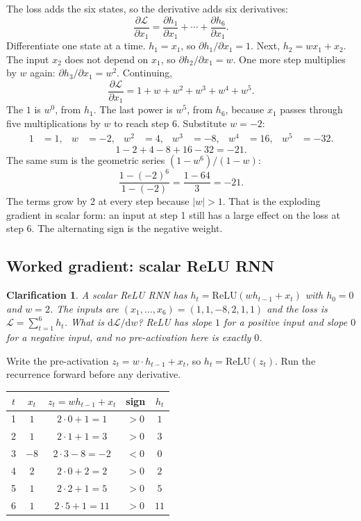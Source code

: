 \documentclass[11pt]{article}
\newtheorem*{clarification}{Clarification}
\begin{document}
The loss adds the six states, so the derivative adds six derivatives:
\[
\frac{\partial\mathcal{L}}{\partial x_1}
=
\frac{\partial h_1}{\partial x_1}
+\cdots+
\frac{\partial h_6}{\partial x_1}.
\]
Differentiate one state at a time. \(h_1=x_1\), so
\(\partial h_1/\partial x_1=1\). Next,
\(h_2=wx_1+x_2\). The input \(x_2\) does not depend on \(x_1\), so
\(\partial h_2/\partial x_1=w\). One more step multiplies by \(w\) again:
\(\partial h_3/\partial x_1=w^2\). Continuing,
\[
\frac{\partial\mathcal{L}}{\partial x_1}
=
1+w+w^2+w^3+w^4+w^5.
\]
The \(1\) is \(w^0\), from \(h_1\). The last power is \(w^5\), from \(h_6\),
because \(x_1\) passes through five multiplications by \(w\) to reach step
6. Substitute \(w=-2\):
\begin{align*}
1&=1, &
w&=-2, &
w^2&=4, &
w^3&=-8, &
w^4&=16, &
w^5&=-32.
\end{align*}
\[
1-2+4-8+16-32=-21.
\]
The same sum is the geometric series \((1-w^6)/(1-w)\):
\[
\frac{1-(-2)^6}{1-(-2)}
=
\frac{1-64}{3}
=
-21.
\]
The terms grow by 2 at every step because \(|w|>1\). That is the exploding
gradient in scalar form: an input at step 1 still has a large effect on the
loss at step 6. The alternating sign is the negative weight.

\subsection{Worked gradient: scalar ReLU RNN}
\label{sec:q4}

\begin{clarification}
A scalar ReLU RNN has \(h_t=\mathrm{ReLU}(w h_{t-1}+x_t)\) with \(h_0=0\)
and \(w=2\). The inputs are \((x_1,\ldots,x_6)=(1,1,-8,2,1,1)\) and the loss
is \(\mathcal{L}=\sum_{t=1}^{6}h_t\). What is \(\mathrm{d}\mathcal{L}/\mathrm{d}w\)?
ReLU has slope \(1\) for a positive input and slope \(0\) for a negative
input, and no pre-activation here is exactly \(0\).
\end{clarification}

Write the pre-activation \(z_t=w\cdot h_{t-1}+x_t\), so
\(h_t=\mathrm{ReLU}(z_t)\). Run the recurrence forward before any
derivative.

\begin{center}
\begin{tabular}{@{}ccccc@{}}
\toprule
\(t\) & \(x_t\) & \(z_t=w h_{t-1}+x_t\) & sign & \(h_t\) \\
\midrule
1 & \(1\)  & \(2\cdot 0+1=1\)   & \(>0\) & \(1\) \\
2 & \(1\)  & \(2\cdot 1+1=3\)   & \(>0\) & \(3\) \\
3 & \(-8\) & \(2\cdot 3-8=-2\) & \(<0\) & \(0\) \\
4 & \(2\)  & \(2\cdot 0+2=2\)   & \(>0\) & \(2\) \\
5 & \(1\)  & \(2\cdot 2+1=5\)   & \(>0\) & \(5\) \\
6 & \(1\)  & \(2\cdot 5+1=11\)  & \(>0\) & \(11\) \\
\bottomrule
\end{tabular}
\end{center}
\end{document}
